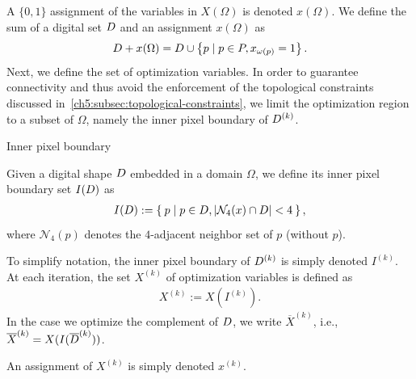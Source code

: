 A $\{0,1\}$ assignment of the variables in $X(\Omega)$ is denoted $x(\Omega)$. We define the sum of a digital set $D$ and an assignment $x(\Omega)$ as
\begin{align*}
	D + x(\Omega) = D \cup \left\{ p \; | \; p \in P, x_{\omega(p)}=1 \right\}.
\end{align*}
%
Next, we define the set of optimization variables. In order to guarantee connectivity and thus avoid the enforcement of the topological constraints discussed in~\cref{ch5:subsec:topological-constraints}, we limit the optimization region to a subset of $\Omega$, namely the inner pixel boundary of  $D^{(k)}$.
\begin{definition}{Inner pixel boundary}

Given a digital shape $D$ embedded in a domain $\Omega$, we define its inner pixel boundary set $I(D)$ as
\begin{align*}
	I(D) := \left\{ \: p \; | \; p \in D, |\mathcal{N}_4(x) \cap D|<4 \: \right\},
\end{align*}
where $\mathcal{N}_4(p)$ denotes the $4$-adjacent neighbor set of $p$ (without $p$). 
\end{definition}
%
%
To simplify notation, the inner pixel boundary of $D^{(k)}$ is simply denoted $I^{(k)}$. At each iteration, the set $X^{(k)}$ of optimization variables is defined as
\begin{align*}
	X^{(k)} := X(I^{(k)}).
\end{align*}
%
In the case we optimize the complement of $D$, we write $\overline{X}^{(k)}$, i.e., $\overline{X}^{(k)} = X(I(\overline{D}^ {(k)}))$.

An assignment of $X^{(k)}$ is simply denoted $x^{(k)}$. 


\subsection{}
\label{ch6:subsec:algorithm}

